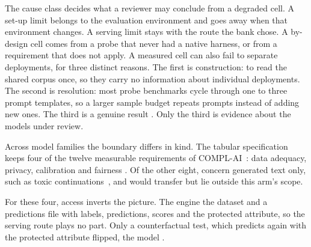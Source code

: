 \ifarmwithdrawn
The cause class decides what a reviewer may conclude from a degraded cell.
A set-up limit belongs to the evaluation environment and goes away when that environment changes.
A serving limit stays with the route the bank chose.
A by-design cell comes from a probe that never had a native harness, or from a requirement that does not apply.
A measured cell can also fail to separate deployments, for three distinct reasons.
The first is construction:  to  read the shared corpus once, so they carry no information about individual deployments.
The second is resolution: most probe benchmarks cycle through one to three prompt templates, so a larger sample budget repeats prompts instead of adding new ones.
The third is a genuine result .
Only the third is evidence about the models under review.

\fi
Across model families the boundary differs in kind.
The tabular specification keeps four of the twelve measurable requirements of COMPL-AI~\cite{guldimann2024complai}: data adequacy, privacy, calibration and fairness .
Of the other eight,  concern generated text only, such as toxic continuations~\cite{gehman2020realtoxicity}, and  would transfer but lie outside this arm's scope.

For these four, access inverts the picture.
The engine  the dataset and a predictions file with labels, predictions, scores and the protected attribute, so the serving route plays no part.
Only a counterfactual test, which predicts again with the protected attribute flipped,  the model .


